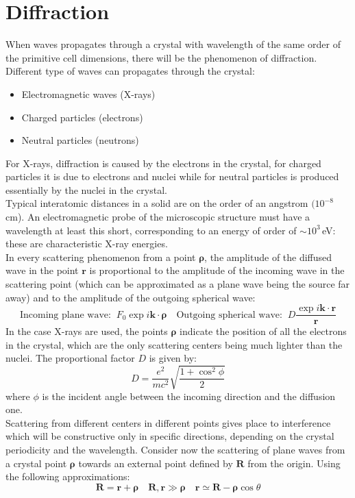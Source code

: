 \documentclass[10.75pt,a4paper,openright,bottom=2cm]{article}
\renewcommand{\Vec}[1]{\boldsymbol{#1}}
\begin{document}
\section{Diffraction}
When waves propagates through a crystal with wavelength of the same order of the primitive cell dimensions, there will be the phenomenon of diffraction. Different type of waves can propagates through the crystal:
\begin{itemize}
    \item Electromagnetic waves (X-rays)
    \item Charged particles (electrons)
    \item Neutral particles (neutrons)
\end{itemize}
For X-rays, diffraction is caused by the electrons in the crystal, for charged particles it is due to electrons and nuclei while for neutral particles is produced essentially by the nuclei in the crystal.\\
Typical interatomic distances in a solid are on the order of an angstrom $(10^{-8}$\,cm). An electromagnetic probe of the microscopic structure must have a wavelength at least this short, corresponding to an energy of order of $\sim10^3$\,eV: these are characteristic X-ray energies.\\
In every scattering phenomenon from a point $\Vec{\rho}$, the amplitude of the diffused wave in the point $\Vec{r}$ is proportional to the amplitude of the incoming wave in the scattering point (which can be approximated as a plane wave being the source far away) and to the amplitude of the outgoing spherical wave:
\[
\text{Incoming plane wave:}\;\; F_0\exp{i\Vec{k}\cdot\Vec{\rho}} \quad \text{Outgoing spherical wave:}\;\; D\frac{\exp{i\Vec{k}\cdot\Vec{r}}}{\Vec{r}}
\]
In the case X-rays are used, the points $\Vec{\rho}$ indicate the position of all the electrons in the crystal, which are the only scattering centers being much lighter than the nuclei. The proportional factor $D$ is given by:
\[
D=\frac{e^2}{mc^2}\sqrt{\frac{1+\cos^2\phi}{2}}
\]
where $\phi$ is the incident angle between the incoming direction and the diffusion one.\\
Scattering from different centers in different points gives place to interference which will be constructive only in specific directions, depending on the crystal periodicity and the wavelength. Consider now the scattering of plane waves from a crystal point $\Vec{\rho}$ towards an external point defined by $\Vec{R}$ from the origin. Using the following approximations:
\[
\Vec{R}=\Vec{r}+\Vec{\rho} \quad \Vec{R},\Vec{r}\gg\Vec{\rho} \quad \Vec{r}\simeq\Vec{R}-\Vec{\rho}\cos\theta
\]
\end{document}
